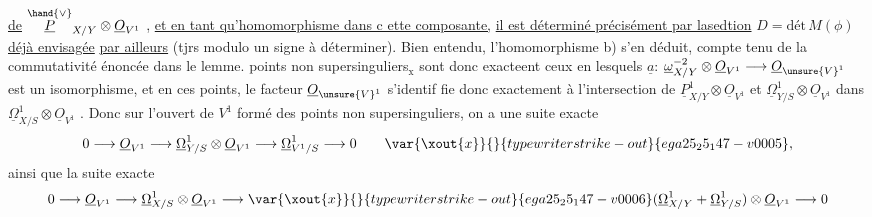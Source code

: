 
\uline{de} $\overset{\hand{\vee}}{\underline{P}}_{X/Y}\otimes\underline{O}_{V^1}$ , \uline{et en tant qu'homomorphisme dans c ette composante,}
\uline{il est déterminé précisément par lasedtion} $D = \text{dét}\,M(\phi)$ \uline{déjà envisagée}
\uline{par ailleurs} (tjrs modulo un signe à déterminer). Bien entendu,
l'homomorphisme b) s'en déduit, compte tenu de la commutativité énoncée
dans le lemme.  points non supersinguliers$_{\text{x}}$ sont donc exacteent
ceux en lesquels $\underline{a}$: $\underline{\omega}^{-2}_{X/Y}\otimes\underline{O}_{V^1}\longrightarrow\underline{O}_{\unsure{V}^1}$ est un isomorphisme, et en
ces points,  le facteur $\underline{O}_{\unsure{V}^1}$ s'identif
fie donc exactement à l'intersection de $\underline{P}^1_{X/Y}\otimes\underline{O}_{V^1}$ et $\underline{\Omega}^1_{Y/S}\otimes\underline{O}_{V^1}$
dans $\underline{\Omega}^1_{X/S}\otimes\underline{O}_{V^1}$ . Donc sur l'ouvert de $V^1$ formé des points non
supersinguliers, on a une suite exacte
\[ 0\longrightarrow\underline{O}_{V^1}\longrightarrow\underline{\Omega}^1_{Y/S}\otimes\underline{O}_{V^1}\longrightarrow\underline{\Omega}^1_{V^1/S}\longrightarrow 0 \qquad \var{\xout{x}}{}{typewriter strike-out}{ega25_25_147-v0005}, \]
ainsi que la suite exacte
\[ 0\longrightarrow\underline{O}_{V^1}\longrightarrow\underline{\Omega}^1_{X/S}\otimes\underline{O}_{V^1}\longrightarrow\var{\xout{x}}{}{typewriter strike-out}{ega25_25_147-v0006}(\underline{\Omega}^1_{X/Y}+\underline{\Omega}^1_{Y/S})\otimes\underline{O}_{V^1}\longrightarrow 0 \]

